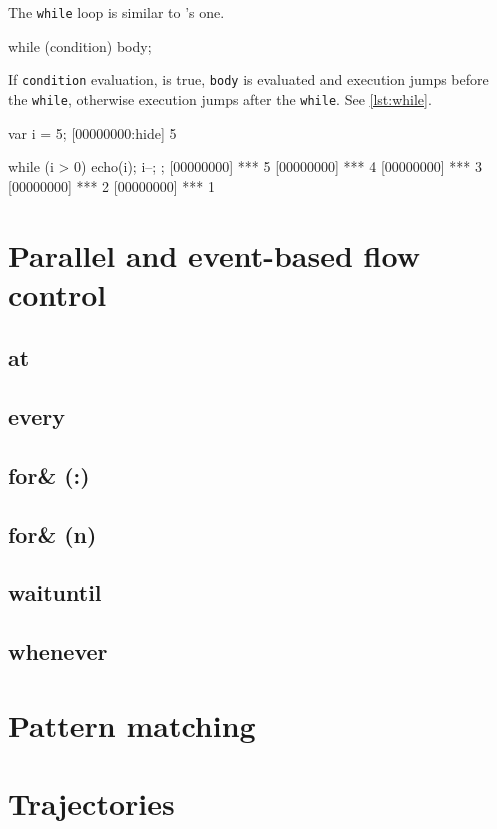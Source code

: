 The \lstinline|while| loop is similar to \C's one.

\begin{urbiscript}[frame=, backgroundcolor=, ]
while (condition)
  body;
\end{urbiscript}

If \lstinline|condition| evaluation, is true, \lstinline|body| is
evaluated and execution jumps before the \lstinline|while|, otherwise execution
jumps after the \lstinline|while|. See \autoref{lst:while}.

\begin{urbiscript}[caption=The \lstinline|while| construct, label=lst:while,
  float=\floatpos]
var i = 5;
[00000000:hide] 5

while (i > 0)
{
  echo(i);
  i--;
};
[00000000] *** 5
[00000000] *** 4
[00000000] *** 3
[00000000] *** 2
[00000000] *** 1
\end{urbiscript}

\FloatBarrier
\section{Parallel and event-based flow control}

\subsection{at}
\subsection{every}
\subsection{for\& (:)}
\subsection{for\& (n)}
\subsection{waituntil}
\subsection{whenever}

\FloatBarrier
\section{Pattern matching}
\FloatBarrier
\section{Trajectories}

